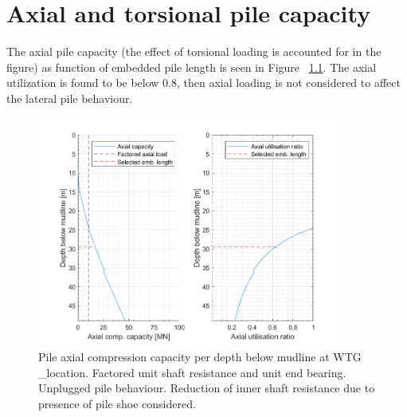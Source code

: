 \chapter{Axial and torsional pile capacity}\label{sec_8}

The axial pile capacity (the effect of torsional loading is accounted for in the figure) as function of embedded pile length is seen in Figure ~\ref{axial_capacity}. The axial utilization is found to be below 0.8, then axial loading is not considered to affect the lateral pile behaviour.


\begin{figure}[!htbp]
\includegraphics[width=0.9\textwidth]{AppendixGenerationFiles/ProjectLocation/axial_capacity.png}
\caption{Pile axial compression capacity per depth below mudline at WTG {\ID_location}. Factored unit shaft resistance and unit end bearing. Unplugged pile behaviour. Reduction of inner shaft resistance due to presence of pile shoe considered.}
\label{axial_capacity}\end{figure}


